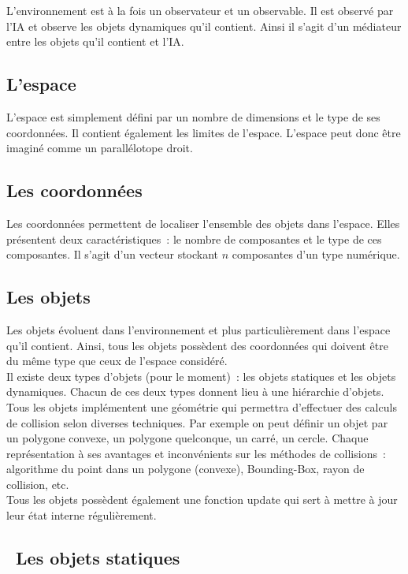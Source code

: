 L'environnement est à la fois un observateur et un observable. Il est observé par l'IA et observe les objets dynamiques qu'il contient. Ainsi il s'agit d'un médiateur entre les objets qu'il contient et l'IA.

\subsection{L'espace}

L'espace est simplement défini par un nombre de dimensions et le type de ses coordonnées.
Il contient également les limites de l'espace. L'espace peut donc être imaginé comme un parallélotope droit.

\subsection{Les coordonnées}

Les coordonnées permettent de localiser l'ensemble des objets dans l'espace. Elles présentent deux caractéristiques~: le nombre de composantes et le type de ces composantes. Il s'agit d'un vecteur stockant $n$ composantes d'un type numérique.

\subsection{Les objets}

Les objets évoluent dans l'environnement et plus particulièrement dans l'espace qu'il contient. Ainsi, tous les objets possèdent des coordonnées qui doivent être du même type que ceux de l'espace considéré.\\
\indent Il existe deux types d'objets (pour le moment)~: les objets statiques et les objets dynamiques. Chacun de ces deux types donnent lieu à une hiérarchie d'objets.\\

Tous les objets implémentent une géométrie qui permettra d'effectuer des calculs de collision selon diverses techniques. Par exemple on peut définir un objet par un polygone convexe, un polygone quelconque, un carré, un cercle. Chaque représentation à ses avantages et inconvénients sur les méthodes de collisions~: algorithme du point dans un polygone (convexe), Bounding-Box, rayon de collision, etc.\\

Tous les objets possèdent également une fonction update qui sert à mettre à jour leur état interne régulièrement.

\subsection{\textbullet ~Les objets statiques}

